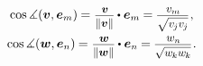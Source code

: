 \nopagebreak\vspace{-0.2em}\begin{gather*}
\cosine \measuredangle ({\bm{v}, \bm{e}_m}) \hspace{-0.1ex}
= \scalebox{.9}{$ \displaystyle\frac{\hspace{.2ex}\raisemath{-0.16em}{\bm{v}}}{\raisemath{-0.05em}{\|\bm{v}\|}} $} \hspace{-0.1ex} \dotp \bm{e}_m \hspace{-0.1ex}
= \hspace{-0.1ex}\scalebox{.9}{$ \displaystyle\frac{\hspace{.2ex}\raisemath{-0.12em}{v_m}}{\raisemath{-0.1em}{\sqrt{\vphantom{i} v_{\hspace{-0.1ex}j} v_{\hspace{-0.1ex}j}}}} $}
\hspace{.1ex} ,
\\
%
\cosine \measuredangle ({\bm{w}, \bm{e}_n}) \hspace{-0.1ex}
= \scalebox{.9}{$ \displaystyle\frac{\hspace{.2ex}\raisemath{-0.16em}{\bm{w}}}{\raisemath{-0.05em}{\|\bm{w}\|}} $} \hspace{-0.1ex} \dotp \bm{e}_n \hspace{-0.1ex}
= \hspace{-0.1ex}\scalebox{.9}{$ \displaystyle\frac{\hspace{.2ex}\raisemath{-0.12em}{w_n}}{\raisemath{-0.1em}{\sqrt{\vphantom{i} w_{\hspace{-0.1ex}k} w_{\hspace{-0.1ex}k}}}} $}
\hspace{.1ex} .
\end{gather*}


